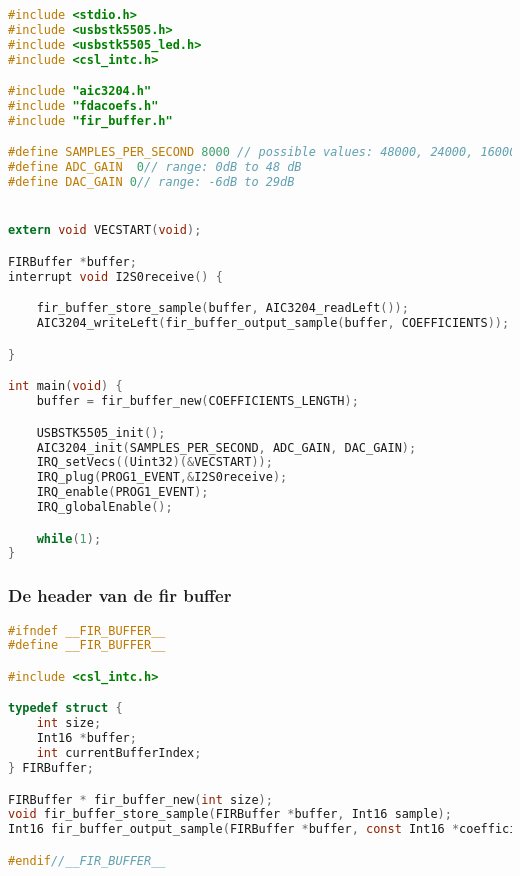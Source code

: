         \begin{lstlisting}[language=c]
#include <stdio.h>
#include <usbstk5505.h>
#include <usbstk5505_led.h>
#include <csl_intc.h>

#include "aic3204.h"
#include "fdacoefs.h"
#include "fir_buffer.h"

#define SAMPLES_PER_SECOND 8000 // possible values: 48000, 24000, 16000, 12000, 9600, and 8000
#define ADC_GAIN  0// range: 0dB to 48 dB
#define DAC_GAIN 0// range: -6dB to 29dB


extern void VECSTART(void);

FIRBuffer *buffer;
interrupt void I2S0receive() {

    fir_buffer_store_sample(buffer, AIC3204_readLeft());
    AIC3204_writeLeft(fir_buffer_output_sample(buffer, COEFFICIENTS));

}

int main(void) {
    buffer = fir_buffer_new(COEFFICIENTS_LENGTH);

    USBSTK5505_init();
    AIC3204_init(SAMPLES_PER_SECOND, ADC_GAIN, DAC_GAIN);
    IRQ_setVecs((Uint32)(&VECSTART));
    IRQ_plug(PROG1_EVENT,&I2S0receive);
    IRQ_enable(PROG1_EVENT);
    IRQ_globalEnable();

    while(1);
}
            \end{lstlisting}
            \clearpage	
        
            \subsubsection{De header van de fir buffer}
            \begin{lstlisting}[language=c]
#ifndef __FIR_BUFFER__
#define __FIR_BUFFER__

#include <csl_intc.h>

typedef struct {
    int size;
    Int16 *buffer;
    int currentBufferIndex;
} FIRBuffer;

FIRBuffer * fir_buffer_new(int size);
void fir_buffer_store_sample(FIRBuffer *buffer, Int16 sample);
Int16 fir_buffer_output_sample(FIRBuffer *buffer, const Int16 *coefficients);

#endif//__FIR_BUFFER__
        
            \end{lstlisting}
            \clearpage
        
